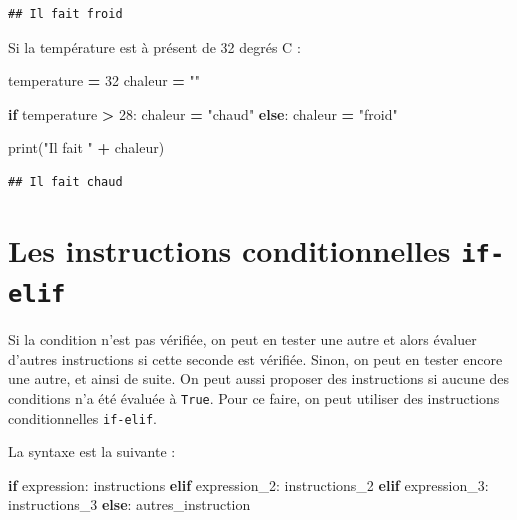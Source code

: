 \documentclass[
  12pt,
]{book}
\newenvironment{Shaded}{\begin{snugshade}}{\end{snugshade}}
\newcommand{\BuiltInTok}[1]{#1}
\newcommand{\ControlFlowTok}[1]{\textcolor[rgb]{0.13,0.29,0.53}{\textbf{#1}}}
\newcommand{\DecValTok}[1]{\textcolor[rgb]{0.00,0.00,0.81}{#1}}
\newcommand{\NormalTok}[1]{#1}
\newcommand{\OperatorTok}[1]{\textcolor[rgb]{0.81,0.36,0.00}{\textbf{#1}}}
\newcommand{\StringTok}[1]{\textcolor[rgb]{0.31,0.60,0.02}{#1}}
\numberwithin{equation}{section}
\numberwithin{countremarque}{section}
\begin{document}
\begin{lstlisting}
## Il fait froid
\end{lstlisting}

Si la température est à présent de 32 degrés C :

\begin{Shaded}
\begin{Highlighting}[]
\NormalTok{temperature }\OperatorTok{=} \DecValTok{32}
\NormalTok{chaleur }\OperatorTok{=} \StringTok{""}

\ControlFlowTok{if}\NormalTok{ temperature }\OperatorTok{\textgreater{}} \DecValTok{28}\NormalTok{:}
\NormalTok{  chaleur }\OperatorTok{=} \StringTok{"chaud"}
\ControlFlowTok{else}\NormalTok{:}
\NormalTok{  chaleur }\OperatorTok{=} \StringTok{"froid"}

\BuiltInTok{print}\NormalTok{(}\StringTok{"Il fait "} \OperatorTok{+}\NormalTok{ chaleur)}
\end{Highlighting}
\end{Shaded}

\begin{lstlisting}
## Il fait chaud
\end{lstlisting}

\section{\texorpdfstring{Les instructions conditionnelles \texttt{if-elif}}{Les instructions conditionnelles if-elif}}\label{les-instructions-conditionnelles-if-elif}

Si la condition n'est pas vérifiée, on peut en tester une autre et alors évaluer d'autres instructions si cette seconde est vérifiée. Sinon, on peut en tester encore une autre, et ainsi de suite. On peut aussi proposer des instructions si aucune des conditions n'a été évaluée à \texttt{True}. Pour ce faire, on peut utiliser des instructions conditionnelles \texttt{if-elif}.

La syntaxe est la suivante :

\begin{Shaded}
\begin{Highlighting}[]
\ControlFlowTok{if}\NormalTok{ expression:}
\NormalTok{  instructions}
\ControlFlowTok{elif}\NormalTok{ expression\_2:}
\NormalTok{  instructions\_2}
\ControlFlowTok{elif}\NormalTok{ expression\_3:}
\NormalTok{  instructions\_3}
\ControlFlowTok{else}\NormalTok{:}
\NormalTok{  autres\_instruction}
\end{Highlighting}
\end{Shaded}
\end{document}
